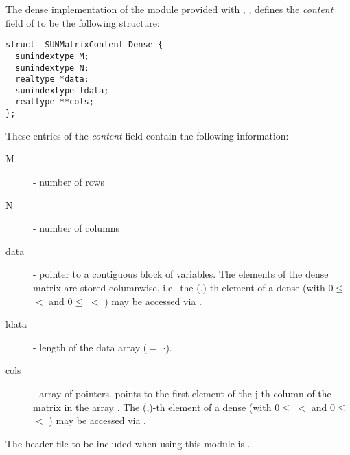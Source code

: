 
The dense implementation of the {\sunmatrix} module provided with
{\sundials}, {\sunmatdense}, defines the {\em content} field
of  to be the following structure:
\begin{verbatim} 
struct _SUNMatrixContent_Dense {
  sunindextype M;
  sunindextype N;
  realtype *data;
  sunindextype ldata;
  realtype **cols;
};
\end{verbatim}
These entries of the \emph{content} field contain the following
information:
\begin{description}
  \item[M] - number of rows
  \item[N] - number of columns
  \item[data] - pointer to a contiguous block of  variables.
    The elements of the dense matrix are stored columnwise, i.e.~the
    (,)-th element of a dense {\sunmatrix}  
    (with $0 \le$  $<$  and $ 0 \le$  $<$ ) 
    may be accessed via .
  \item[ldata] - length of the data array ($=$ $\cdot$).
  \item[cols] - array of pointers.  points to the first
    element of the j-th column of the matrix in the array .
    The (,)-th element of a dense {\sunmatrix} 
    (with $0 \le$  $<$  and $ 0 \le$  $<$ ) 
    may be accessed via .
\end{description}

\noindent The header file to be included when using this module 
is . \\

